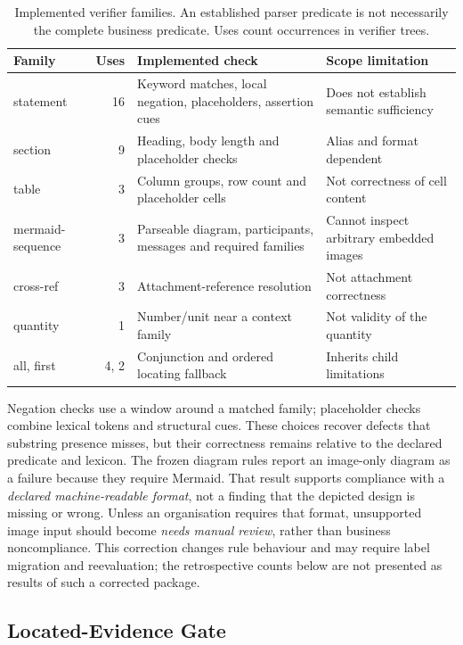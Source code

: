 \begin{table}[!ht]
\caption{Implemented verifier families. An established parser predicate is not necessarily the complete business predicate. Uses count occurrences in verifier trees.}
\label{tab:verifiers}
\centering\footnotesize
\begin{tabularx}{\textwidth}{@{}p{2.4cm}rXX@{}}
\toprule
Family & Uses & Implemented check & Scope limitation \\
\midrule
statement & 16 & Keyword matches, local negation, placeholders, assertion cues & Does not establish semantic sufficiency \\
section & 9 & Heading, body length and placeholder checks & Alias and format dependent \\
table & 3 & Column groups, row count and placeholder cells & Not correctness of cell content \\
mermaid-sequence & 3 & Parseable diagram, participants, messages and required families & Cannot inspect arbitrary embedded images \\
cross-ref & 3 & Attachment-reference resolution & Not attachment correctness \\
quantity & 1 & Number/unit near a context family & Not validity of the quantity \\
all, first & 4, 2 & Conjunction and ordered locating fallback & Inherits child limitations \\
\bottomrule
\end{tabularx}
\end{table}

Negation checks use a window around a matched family; placeholder checks combine lexical tokens and structural cues. These choices recover defects that substring presence misses, but their correctness remains relative to the declared predicate and lexicon. The frozen diagram rules report an image-only diagram as a failure because they require Mermaid. That result supports compliance with a \emph{declared machine-readable format}, not a finding that the depicted design is missing or wrong. Unless an organisation requires that format, unsupported image input should become \emph{needs manual review}, rather than business noncompliance. This correction changes rule behaviour and may require label migration and reevaluation; the retrospective counts below are not presented as results of such a corrected package.

\subsection{Located-Evidence Gate}\label{sec:gate}

